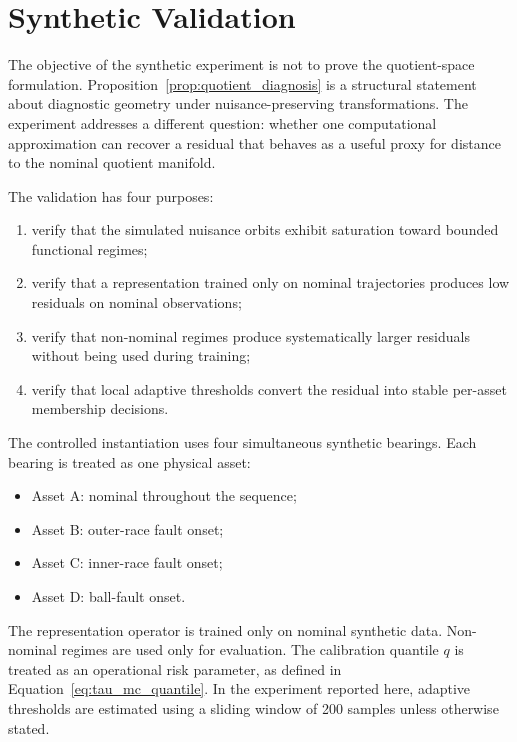 \documentclass[11pt,letterpaper]{article}
\begin{document}
\section{Synthetic Validation}
\label{sec:synthetic_validation}

The objective of the synthetic experiment is not to prove the quotient-space formulation.
Proposition~\ref{prop:quotient_diagnosis} is a structural statement about diagnostic geometry under nuisance-preserving transformations.
The experiment addresses a different question: whether one computational approximation can recover a residual that behaves as a useful proxy for distance to the nominal quotient manifold.

The validation has four purposes:

\begin{enumerate}[label=(\roman*)]
    \item verify that the simulated nuisance orbits exhibit saturation toward bounded functional regimes;
    \item verify that a representation trained only on nominal trajectories produces low residuals on nominal observations;
    \item verify that non-nominal regimes produce systematically larger residuals without being used during training;
    \item verify that local adaptive thresholds convert the residual into stable per-asset membership decisions.
\end{enumerate}

The controlled instantiation uses four simultaneous synthetic bearings.
Each bearing is treated as one physical asset:

\begin{itemize}
    \item Asset A: nominal throughout the sequence;
    \item Asset B: outer-race fault onset;
    \item Asset C: inner-race fault onset;
    \item Asset D: ball-fault onset.
\end{itemize}

The representation operator is trained only on nominal synthetic data.
Non-nominal regimes are used only for evaluation.
The calibration quantile \(q\) is treated as an operational risk parameter, as defined in Equation~\eqref{eq:tau_mc_quantile}.
In the experiment reported here, adaptive thresholds are estimated using a sliding window of 200 samples unless otherwise stated.
\end{document}
